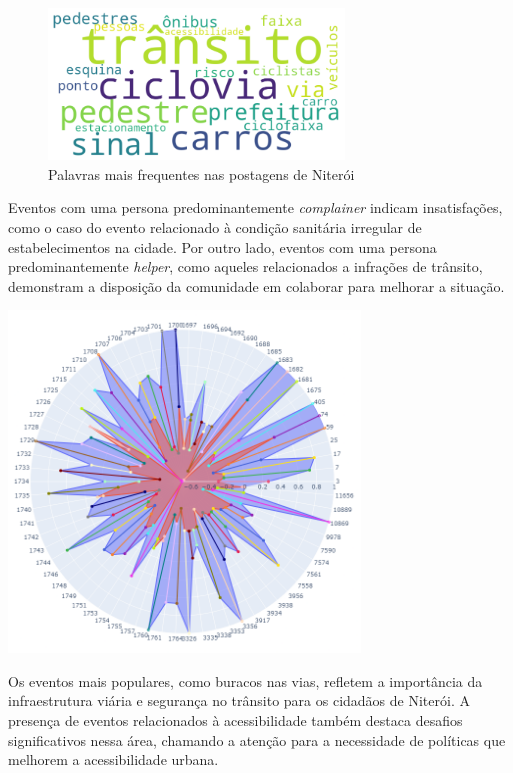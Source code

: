 \begin{figure}[htb]
	\centering
	\includegraphics[width=0.7\textwidth]{images/wordcloud_niteroi.png}
	\caption{Palavras mais frequentes nas postagens de Niterói}
	\label{fig:wordcloud_niteroi}
\end{figure}

Eventos com uma persona predominantemente \textit{complainer} indicam insatisfações, como o caso do evento relacionado à condição sanitária irregular de estabelecimentos na cidade. Por outro lado, eventos com uma persona predominantemente \textit{helper}, como aqueles relacionados a infrações de trânsito, demonstram a disposição da comunidade em colaborar para melhorar a situação.

\begin{quadro}[htb]
	\centering
	\includegraphics[width=0.7\textwidth]{images/social_barometer_niteroi.png}
	\caption{social barometer niteroi}
	\label{fig:social_barometer_niteroi}
\end{quadro}

Os eventos mais populares, como buracos nas vias, refletem a importância da infraestrutura viária e segurança no trânsito para os cidadãos de Niterói. A presença de eventos relacionados à acessibilidade também destaca desafios significativos nessa área, chamando a atenção para a necessidade de políticas que melhorem a acessibilidade urbana.

